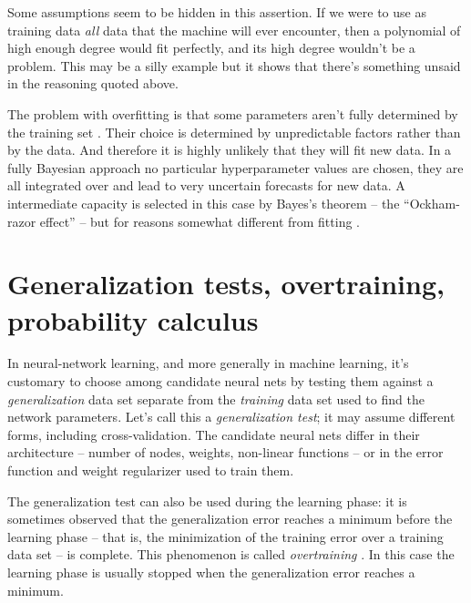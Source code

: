 \documentclass[\ifafour a4paper,12pt,\else a5paper,10pt,\fi%
onecolumn,oneside,article,%
british%
]{memoir}
\theoremstyle{remark}
\theoremstyle{innote}
\newcommand*{\citep}{\parencites}
\renewcommand*{\|}{\mathpunct{|}}
\newcommand*{\sect}{\S}%
\begin{document}
Some assumptions seem to be hidden in this assertion. If we were to use as
training data \emph{all} data that the machine will ever encounter, then a
polynomial of high enough degree would fit perfectly, and its high degree
wouldn't be a problem. This may be a silly example but it shows that
there's something unsaid in the reasoning quoted above.

The problem with overfitting is that some parameters aren't fully
determined by the training set \citep[see \enquote{well-determined
  parameters} in][\sect~4.4]{mackay1992}. Their choice is determined by
unpredictable factors rather than by the data. And therefore it is highly
unlikely that they will fit new data. In a fully Bayesian approach no
particular hyperparameter values are chosen, they are all integrated over
and lead to very uncertain forecasts for new data. A intermediate capacity
is selected in this case by Bayes's theorem -- the \enquote{Ockham-razor
  effect} -- but for reasons somewhat different from fitting \citep[see
Fig.~3.13 in][\sect~3.4]{bishop2006}.



\section{Generalization tests, overtraining, probability calculus}
\label{sec:gentest_overtr}

In neural-network learning, and more generally in machine learning, it's
customary to choose among candidate neural nets by testing them against a
\emph{generalization} data set separate from the \emph{training} data set
used to find the network parameters. Let's call this a \emph{generalization
  test}; it may assume different forms, including cross-validation. The
candidate neural nets differ in their architecture -- number of nodes,
weights, non-linear functions -- or in the error function and weight
regularizer used to train them.

The generalization test can also be used during the learning phase: it is
sometimes observed that the generalization error reaches a minimum before
the learning phase -- that is, the minimization of the training error over
a training data set -- is complete. This phenomenon is called
\emph{overtraining}
\citep{sjoebergetal1995,bishop1995b}[\sect~9.2.4]{bishop1995_r2005}[\sect~5.5.2]{bishop2006}[\sect~7.8]{goodfellowetal2016}.
In this case the learning phase is usually stopped when the generalization
error reaches a minimum.
\end{document}
